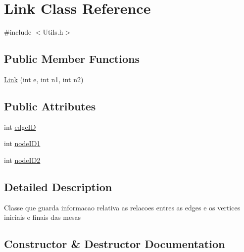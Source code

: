 \hypertarget{classLink}{}\section{Link Class Reference}
\label{classLink}


{\ttfamily \#include $<$Utils.\+h$>$}

\subsection*{Public Member Functions}
\begin{DoxyCompactItemize}
\item 
\hyperlink{classLink_a982a39ac15c2fcaa510c0b5a54f07da8}{Link} (int e, int n1, int n2)
\end{DoxyCompactItemize}
\subsection*{Public Attributes}
\begin{DoxyCompactItemize}
\item 
int \hyperlink{classLink_a3f43504b7c06e27ec9eb8f724b1fd1fe}{edge\+ID}
\item 
int \hyperlink{classLink_ac032a7209d3ef89f093c6056bd20b524}{node\+I\+D1}
\item 
int \hyperlink{classLink_a681c549c9ce365d7ab61267f2d66fc66}{node\+I\+D2}
\end{DoxyCompactItemize}


\subsection{Detailed Description}
Classe que guarda informacao relativa as relacoes entres as edges e os vertices iniciais e finais das mesas 

\subsection{Constructor \& Destructor Documentation}
